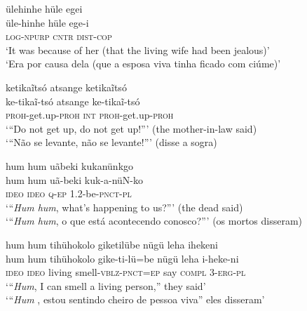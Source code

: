\documentclass[output=paper,
modfonts,nonflat
]{langsci/langscibook}
\begin{document}
\ea ülehinhe hüle egei \\[.3em]
\gll üle-hinhe	hüle	ege-i \\
\textsc{log-npurp}	\textsc{cntr}	\textsc{dist-cop} \\
\glt ‘It was because of her (that the living wife had been jealous)’ \\
‘Era por causa dela (que a esposa viva tinha ficado com ciúme)’ \\
\z

\ea ketikaĩtsó atsange ketikaĩtsó \\[.3em]
\gll ke-tikaĩ-tsó		atsange		ke-tikaĩ-tsó	\\		
\textsc{proh}-get.up-\textsc{proh}	\textsc{int} 		\textsc{proh-}get.up-\textsc{proh} 	\\
 \glt ‘“Do not get up, do not get up!”’ (the mother-in-law said) \\
‘“Não se levante, não se levante!”’ (disse a sogra) \\
\z

 
\ea hum hum uãbeki kukanünkgo \\[.3em]
\gll hum hum	uã-beki		kuk-a-nüN-ko \\
\textsc{ideo} \textsc{ideo} 	\textsc{q-ep}		1.2-be-\textsc{pnct-pl} \\
\glt ‘“\textit{Hum hum}, what's happening to us?”’ (the dead said) \\
‘“\textit{Hum hum}, o que está acontecendo conosco?”’ (os mortos disseram) \\
\z

\ea hum hum tihühokolo giketilübe nügü leha ihekeni \\[.3em]
\gll hum hum{\footnotemark}{}	tihühokolo	gike-ti-lü=be 			nügü	leha	i-heke-ni \\ 
\textsc{ideo} \textsc{ideo}	living 		smell-\textsc{vblz-pnct=ep} 	say 	\textsc{compl} \textsc{3-erg-pl} \\
\glt ‘“\textit{Hum},  I can smell a living person,” they said’\\
‘“\textit{Hum }, estou sentindo cheiro de pessoa viva” eles disseram’ \\
\z
\end{document}
